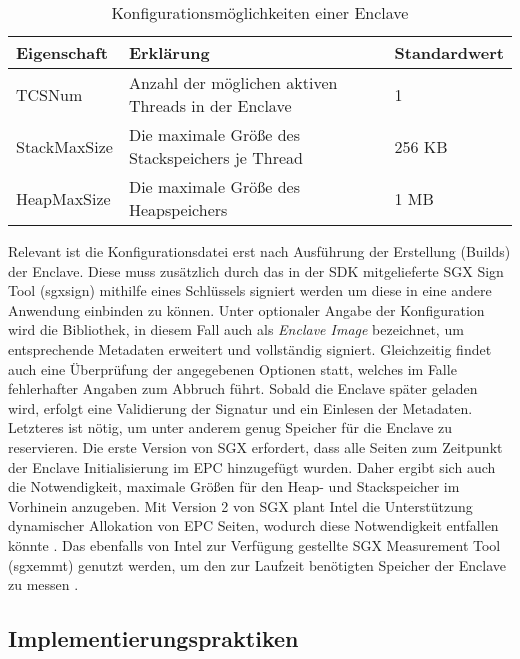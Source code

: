 \begin{table}[h]
	\centering
	\begin{tabular}{|l|l|l|}
		\hline
		\textbf{Eigenschaft} & \textbf{Erklärung} & \textbf{Standardwert} \\
		\hline
		TCSNum & Anzahl der möglichen aktiven Threads in der Enclave & 1 \\
		\hline
		StackMaxSize & Die maximale Größe des Stackspeichers je Thread & 256 KB \\
		\hline
		HeapMaxSize & Die maximale Größe des Heapspeichers & 1 MB \\
		\hline
	\end{tabular}
	\caption{Konfigurationsmöglichkeiten einer Enclave}
	\label{tab:sgxconfig}
\end{table}
Relevant ist die Konfigurationsdatei erst nach Ausführung der Erstellung (Builds) der Enclave. Diese muss zusätzlich durch das in der SDK mitgelieferte SGX Sign Tool (sgx\textunderscore sign) mithilfe eines Schlüssels signiert werden um diese in eine andere Anwendung einbinden zu können. Unter optionaler Angabe der Konfiguration wird die Bibliothek, in diesem Fall auch als \textit{Enclave Image} bezeichnet, um entsprechende Metadaten erweitert und vollständig signiert. Gleichzeitig findet auch eine Überprüfung der angegebenen Optionen statt, welches im Falle fehlerhafter Angaben zum Abbruch führt. Sobald die Enclave später geladen wird, erfolgt eine Validierung der Signatur und ein Einlesen der Metadaten. Letzteres ist nötig, um unter anderem genug Speicher für die Enclave zu reservieren. Die erste Version von SGX erfordert, dass alle Seiten zum Zeitpunkt der Enclave Initialisierung im EPC hinzugefügt wurden. Daher ergibt sich auch die Notwendigkeit, maximale Größen für den Heap- und Stackspeicher im Vorhinein anzugeben. Mit Version 2 von SGX plant Intel die Unterstützung dynamischer Allokation von EPC Seiten, wodurch diese Notwendigkeit entfallen könnte \cite{McKeen2016}. Das ebenfalls von Intel zur Verfügung gestellte SGX Measurement Tool (sgx\textunderscore emmt) genutzt werden, um den zur Laufzeit benötigten Speicher der Enclave zu messen \cite{WinDev}.

%

\subsection{Implementierungspraktiken}

